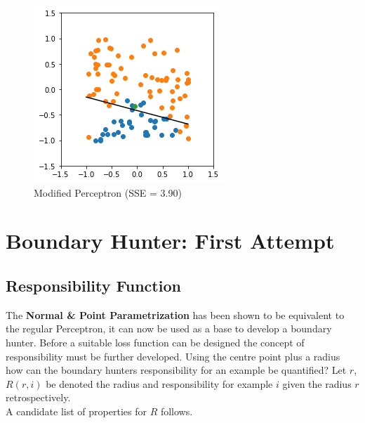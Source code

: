 \documentclass[notitlepage]{report}
\theoremstyle{definition}
\begin{document}
\begin{figure}[H]
\begin{minipage}[b]{0.4\textwidth}
    \includegraphics[width=\textwidth]{Modified-Perceptron-(Normal-Point).png}
    \caption{Modified Perceptron (SSE = 3.90)}
    \label{fig:com-normal-point}
  \end{minipage}
\end{figure}

\chapter{Boundary Hunter: First Attempt}
\section{Responsibility Function}
The \textbf{Normal \& Point Parametrization} has been shown to be equivalent to the regular Perceptron, it can now be used as a base to develop a boundary hunter. Before a suitable loss function can be designed the concept of responsibility must be further developed. Using the centre point plus a radius how can the boundary hunters responsibility for an example be quantified? Let $r$, $R(r, i)$ be denoted the radius and responsibility for example $i$ given the radius $r$ retrospectively.\\

A candidate list of properties for $R$ follows.
\end{document}
